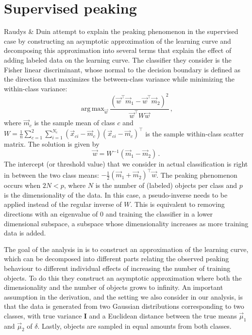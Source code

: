 \documentclass[runningheads,a4paper]{llncs}\usepackage[]{graphicx}\usepackage[]{color}
\DeclareMathOperator*{\argmax}{arg\,max}
\begin{document}
\section{Supervised peaking} \label{section:supervisedpeaking}
Raudys \& Duin \cite{Raudys1998} attempt to explain the peaking phenomenon in the supervised case by constructing an asymptotic approximation of the learning curve and decomposing this approximation into several terms that explain the effect of adding labeled data on the learning curve. The classifier they consider is the Fisher linear discriminant, whose normal to the decision boundary is defined as the direction that maximizes the between-class variance while minimizing the within-class variance:
\begin{equation} \label{eq:fisherobjective}
\argmax_{\vec{w}} \frac{(\vec{w}^\top \vec{m}_1 - \vec{w}^\top \vec{m}_2)^2}{\vec{w}^\top W \vec{w}} \, ,
\end{equation}
where $\vec{m}_c$ is the sample mean of class $c$ and $W=\tfrac{1}{n} \sum_{c=1}^2 \sum_{i=1}^{N_c} (\vec{x}_{ci} - \vec{m}_c)(\vec{x}_{ci} - \vec{m}_c)^\top$ is the sample within-class scatter matrix. The solution is given by
\begin{equation} \label{eq:Wformulation}
\vec{w} = W^{-1} (\vec{m}_1-\vec{m}_2) \, .
\end{equation}
The intercept (or threshold value) that we consider in actual classification is right in between the two class means:
$-\frac{1}{2}(\vec{m}_1+\vec{m}_2)^\top \vec{w}$.  The peaking phenomenon occurs when $2N<p$, where $N$ is the number of (labeled) objects per class and $p$ is the dimensionality of the data. In this case, a pseudo-inverse needs to be applied instead of the regular inverse of $W$. This is equivalent to removing directions with an eigenvalue of $0$ and training the classifier in a lower dimensional subspace, a subspace whose dimensionality increases as more training data is added.

The goal of the analysis in \cite{Raudys1998} is to construct an approximation of the learning curve, which can be decomposed into different parts relating the observed peaking behaviour to different individual effects of increasing the number of training objects. To do this they construct an asymptotic approximation where both the dimensionality and the number of objects grows to infinity. An important assumption in the derivation, and the setting we also consider in our analysis, is that the data is generated from two Gaussian distributions corresponding to two classes, with true variance $\mathbf{I}$ and a Euclidean distance between the true means $\vec{\mu}_1$ and $\vec{\mu}_2$ of $\delta$. Lastly, objects are sampled in equal amounts from both classes.
\end{document}
